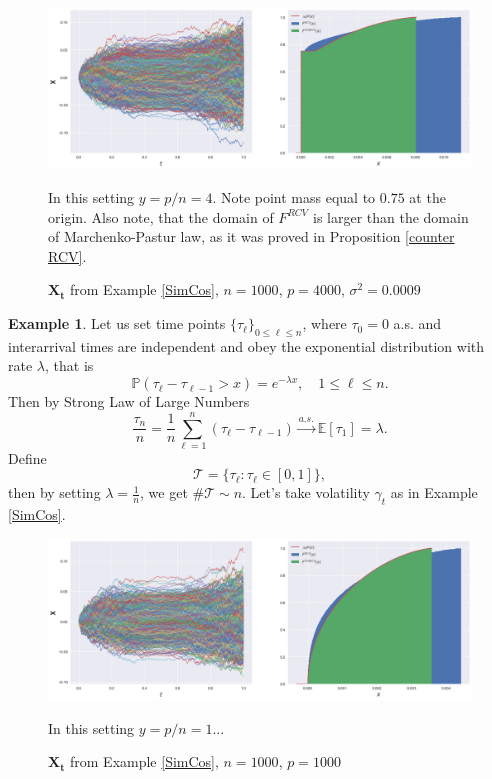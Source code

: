 \documentclass[a4paper,11pt]{article}
\theoremstyle{plain}
\theoremstyle{definition}
\newtheorem{exmp}[thm]{Example}
\newcommand{\ME}{\mathbb{E}}
\newcommand{\MP}{\mathbb{P}}
\begin{document}
    \begin{figure}
    	\begin{center} \centering
    		\includegraphics[scale=0.4]{XCos2}
    		\caption{ $\mathbf{X_t}$ from Example \ref{SimCos}, $n = 1000$, $p=4000$, $\sigma^2 = 0.0009$ }
    		\smallskip
    		\small
    		In this setting $y = p/n = 4$. Note point mass equal to $0.75$ at the origin. Also note, that the domain of $F^{RCV}$ is larger than the domain of Marchenko-Pastur law, as it was proved in Proposition \ref{counter RCV}.
    	\end{center}
    \end{figure}
    
    \begin{exmp} \label{PosTimes}
    	Let us set time points $ \{\tau_\ell\}_{0 \leq \ell \leq n}$, where $\tau_0 = 0$ a.s. and interarrival times are independent and obey the exponential distribution with rate $\lambda$, that is 
    	\[ \MP(\tau_{\ell} - \tau_{\ell-1} > x) =  e^{-\lambda x}, \quad 1 \leq \ell \leq n. \]
    	Then by Strong Law of Large Numbers
    	\[ \frac{\tau_n}{n} = \frac{1}{n} \sum_{\ell=1}^{n} (\tau_{\ell} - \tau_{\ell-1}) \xrightarrow{a.s.} \ME[\tau_1] = \lambda. \]
    	Define
    	\[ \mathcal{T} = \{\tau_\ell : \tau_\ell \in [0, 1]\}, \]
    	then by setting $\lambda = \frac{1}{n}$, we get $\#\mathcal{T} \sim n$.
    	Let's take volatility $\gamma_t$ as in Example \ref{SimCos}.
    \end{exmp}
    
    \begin{figure}
    	\begin{center} \centering
    		\includegraphics[scale=0.4]{XCos}
    		\caption{ $\mathbf{X_t}$ from Example \ref{SimCos}, $n = 1000$, $p=1000$ }
    		\smallskip
    		\small
    		In this setting $y = p/n = 1$...
    	\end{center}
    \end{figure}
    
\end{document}
